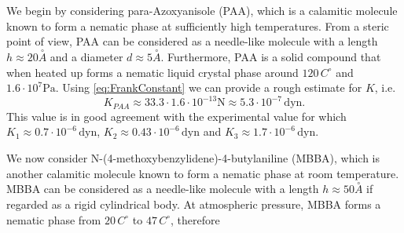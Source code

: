 \documentclass[%
 aip,
 amsmath,amssymb,
 reprint,%
]{revtex4-1}
\begin{document}
We begin by considering para-Azoxyanisole (PAA), which is a calamitic molecule known to form a nematic phase at sufficiently high temperatures.
From a steric point of view, PAA can be considered as a needle-like molecule with a length $h\approx 20 \overset{\circ}{A}$ and a diameter $d\approx 5 \overset{\circ}A$\cite{dGJ}.
Furthermore, PAA is a solid compound that when heated up forms a nematic liquid crystal phase around $120\,C^\circ$ and $1.6\cdot 10^{7} \text{Pa}$\cite{dGJ,DCJ71}.
Using \eqref{eq:FrankConstant} we can provide a rough estimate for $K$, i.e.
\begin{equation}
  K_{PAA} \approx 33.3 \cdot 1.6\cdot 10^{-13} \text{N} \approx 5.3\cdot 10^{-7} \,\text{dyn}.
\end{equation}
This value is in good agreement with the experimental value for which $K_1\approx 0.7\cdot 10^{-6}\,\text{dyn}$, $K_2\approx 0.43\cdot 10^{-6}\,\text{dyn}$ and $K_3\approx 1.7 \cdot 10^{-6}\,\text{dyn}$\cite{dGJ}.

We now consider N-(4-methoxybenzylidene)-4-butylaniline (MBBA), which is another calamitic molecule known to form a nematic phase at room temperature. MBBA can be considered as a needle-like molecule with a length $h\approx 50 \overset{\circ}{A}$ if regarded as a rigid cylindrical body\cite{CRB71}.
At atmospheric pressure, MBBA forms a nematic phase from $20\,C^\circ$ to $47\,C^\circ$, therefore 
\end{document}
